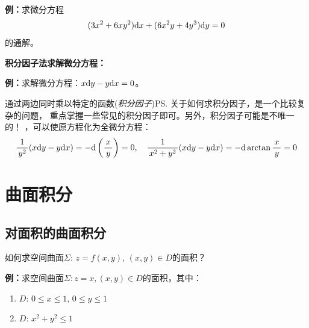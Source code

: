 {\bf 例：}求微分方程
$$(3x^2+6xy^2)\mathrm{d} x+(6x^2y+4y^3)\mathrm{d} y=0$$
的通解。

{\bf 积分因子法求解微分方程：}

{\bf 例：}求解微分方程：$x\mathrm{d} y-y\mathrm{d} x=0$。

通过两边同时乘以特定的函数({\it 积分因子})\ps{关于如何求积分因子，是一个比较复杂的问题，
重点掌握一些常见的积分因子即可。另外，积分因子可能是不唯一的！}
，可以使原方程化为全微分方程：
$${\displaystyle\frac{\,{1}\,}{\,{y^2}\,}}(x\mathrm{d} y-y\mathrm{d} x) =-\mathrm{d}\left(\displaystyle\frac{\,{x}\,}{\,{y}\,}\right)
=0,\quad {\displaystyle\frac{\,{1}\,}{\,{x^2+y^2}\,}}(x\mathrm{d} y-y\mathrm{d} x) =-\mathrm{d}\arctan\displaystyle\frac{\,{x}\,}{\,{y}\,}=0$$

\section{曲面积分}

\subsection{对面积的曲面积分}

如何求空间曲面$\Sigma:\,z=f(x,y),\,(x,y)\in D$的面积？

{\bf 例：}求空间曲面$\Sigma:z=x,(x,y)\in D$的面积，其中：
\begin{enumerate}[(1)]
  \setlength{\itemindent}{1cm}
  \item $D:\,0\leq x\leq 1,\,0\leq y\leq 1$
  \item $D:\,x^2+y^2\leq 1$
\end{enumerate}

